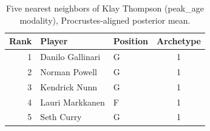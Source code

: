 \begin{table}[htbp]
  \centering\small
  \begin{tabular}{rllc}
    \toprule
    Rank & Player & Position & Archetype \\
    \midrule
    1 & Danilo Gallinari & G & 1 \\
    2 & Norman Powell & G & 1 \\
    3 & Kendrick Nunn & G & 1 \\
    4 & Lauri Markkanen & F & 1 \\
    5 & Seth Curry & G & 1 \\
    \bottomrule
  \end{tabular}
  \caption{Five nearest neighbors of Klay Thompson (peak_age modality), Procrustes-aligned posterior mean.}
  \label{tab:Klay_Thompson_neighbors_peak_age}
\end{table}

